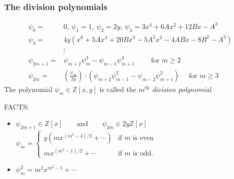 \documentclass[handout]{beamer}%
\theoremstyle{definition}
\begin{document}
\begin{frame}\frametitle{The division polynomials}\pause

\begin{Definition}[Division Polynomials of $E:y^2=x^3+Ax+B$ ($p>3$)]\vspace*{-0.7cm}
\begin{align*}
        \psi_{0} =& 0,\
        \psi_{1} = 1,\
        \psi_{2} = 2y,\
        \psi_{3} = 3x^{4} + 6Ax^{2} + 12Bx - A^{2}\\
        \psi_{4} =& 4y(x^{6} + 5Ax^{4} + 20Bx^{3} - 5A^{2}x^{2} - 4ABx - 8B^{2} - A^{3}) \\
        &\vdots\\
        \psi_{2m+1} =& \psi_{m+2}\psi_{m}^{3}-\psi_{m-1}\psi^{3}_{m+1} \qquad \text{ for } m \geq 2\\
        \psi_{2m}  =& \left(\frac{\psi_{m}}{2y}\right)\cdot(\psi_{m+2}\psi^{2}_{m-1}-\psi_{m-2}\psi^{2}_{m+1}) \quad \text{ for } m \geq 3
\end{align*}
The polynomial $\psi_m\in{\mathbb Z}[x,y]$ is called the $m^{\text{th}}$ \emph{division polynomial}
\end{Definition}

\begin{beamerboxesrounded}[upper=block title example,lower=block body alerted,shadow=true]{FACTS:}
\begin{itemize}
\item $\psi_{2m+1}\in\mathbb{Z}[x]\qquad\text{and}\qquad\psi_{2m}\in 2y\mathbb{Z}[x]$
\quad $\psi_m=\begin{cases} y(mx^{(m^2-4)/2}+\cdots) &\text{if $m$ is even}\\
mx^{(m^2-1)/2}+\cdots &\text{if $m$ is odd.}\end{cases}$
\item $\psi_m^2=m^2x^{m^2-1}+\cdots$
\end{itemize}
\end{beamerboxesrounded}

\end{frame}
\end{document}
